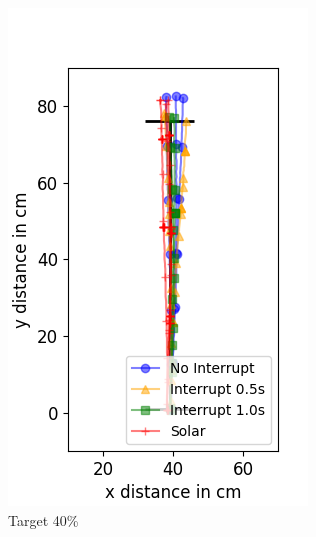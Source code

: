 \begin{figure}
	\centering
	\begin{subfigure}[b]{0.32\textwidth}
		\includegraphics[width=\textwidth]{pics/straight_40.png}
		\caption{Target 40\%}
		\label{fig:stra_exp1}
	\end{subfigure}
	\begin{subfigure}[b]{0.32\textwidth}

\end{subfigure}
\end{figure}
